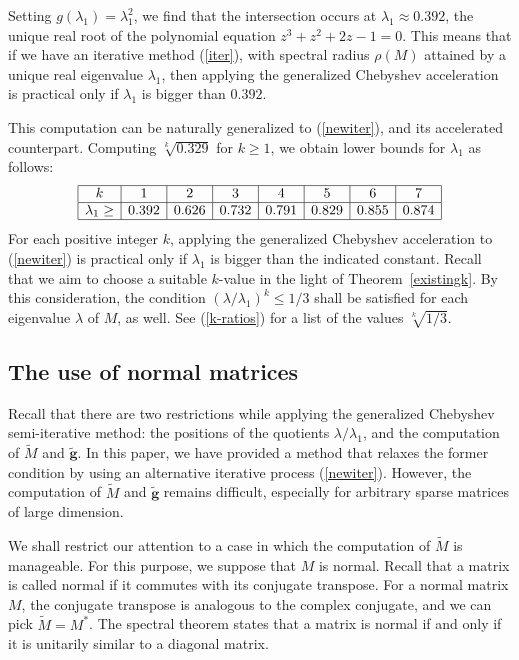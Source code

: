 \documentclass[reqno]{amsart}
\newcommand{\mb}{\mathbf}
\numberwithin{equation}{section}
\theoremstyle{plain}
\theoremstyle{definition}
\begin{document}
Setting $g(\lambda_1)=\lambda_1^2$, we find that the intersection occurs at $\lambda_1 \approx 0.392$, the unique real root of the polynomial equation $z^3 + z^2 + 2z - 1=0$. This means that if we have an iterative method (\ref{iter}), with spectral radius $\rho(M)$ attained by a unique real eigenvalue $\lambda_1$, then applying the generalized Chebyshev acceleration is practical only if  $\lambda_1$ is bigger than $0.392$.

This computation can be naturally generalized to (\ref{newiter}), and its accelerated counterpart. Computing $\sqrt[k]{0.329}$ for $k\geq 1$, we obtain lower bounds for $\lambda_1$ as follows:
\begin{equation}\label{feas}
\begin{array}{|c|c|c|c|c|c|c|c|}\hline
	k&1&2&3&4&5&6&7\\ \hline
	\lambda_1 \geq&0.392&0.626&0.732&0.791&0.829&0.855&0.874\\\hline
\end{array}
\end{equation}
For each positive integer $k$, applying the generalized Chebyshev acceleration to (\ref{newiter}) is practical only if  $\lambda_1$ is bigger than the indicated constant. Recall that we aim to choose a suitable $k$-value in the light of Theorem~\ref{existingk}. By this consideration, the condition $(\lambda/\lambda_1)^k \leq 1/3$ shall be satisfied for each eigenvalue $\lambda$ of $M$, as well. See (\ref{k-ratios}) for a list of the values $\sqrt[k]{1/3}$.

\subsection{The use of normal matrices}
Recall that there are two restrictions while applying the generalized Chebyshev semi-iterative method: the positions of the quotients $\lambda/\lambda_1$, and the computation of $\widetilde{M}$ and $\widetilde{\mb{g}}$. In this paper, we have provided a method that relaxes the former condition by using an alternative iterative process (\ref{newiter}). However, the computation of $\widetilde{M}$ and $\widetilde{\mb{g}}$ remains difficult, especially for arbitrary sparse matrices of large dimension. 

We shall restrict our attention to a case in which the computation of $\widetilde{M}$ is manageable. For this purpose, we suppose that $M$ is normal. Recall that a matrix is called normal if it commutes with its conjugate transpose. For a normal matrix $M$, the conjugate transpose is analogous to the complex conjugate, and we can pick $\widetilde{M} = M^*$. The spectral theorem states that a matrix is normal if and only if it is unitarily similar to a diagonal matrix.
\end{document}
